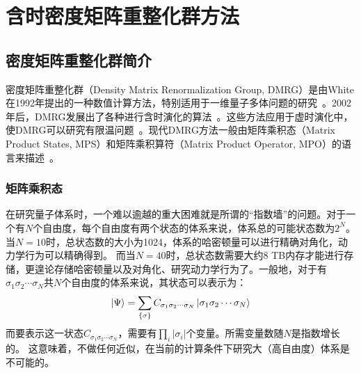 \documentclass{article}
\begin{document}
\section{含时密度矩阵重整化群方法}
\subsection{密度矩阵重整化群简介}
密度矩阵重整化群（Density Matrix Renormalization Group, DMRG）是由White在1992年提出的一种数值计算方法，特别适用于一维量子多体问题的研究~\cite{White92, White93}。2002年后，DMRG发展出了各种进行含时演化的算法~\cite{Caza02, Luo03, Vidal04, White04, Delay04, White05td, Haeg11, Haeg16, Garnet09}。这些方法应用于虚时演化中，使DMRG可以研究有限温问题~\cite{Vers04, Zwolak04, White05ft, Bart13}。现代DMRG方法一般由矩阵乘积态（Matrix Product States, MPS）和矩阵乘积算符（Matrix Product Operator, MPO）的语言来描述~\cite{Schol11}。

\subsubsection{矩阵乘积态}

在研究量子体系时，一个难以逾越的重大困难就是所谓的“指数墙”的问题。对于一个有$N$个自由度，每个自由度有两个状态的体系来说，体系总的可能状态数为$2^N$。
当$N=10$时，总状态数的大小为1024，体系的哈密顿量可以进行精确对角化，动力学行为可以精确得到。
而当$N=40$时，总状态数需要大约8 TB内存才能进行存储，更遑论存储哈密顿量以及对角化、研究动力学行为了。一般地，对于有$\sigma_1\sigma_2\cdots\sigma_N $共$N$个自由度的体系来说，其状态可以表示为：
\begin{equation}
        | \Psi \rangle  = \sum_{\{\sigma\}} C_{\sigma_1\sigma_2\cdots\sigma_N }  \ket{ \sigma_1\sigma_2\cdots\sigma_N } 
\end{equation}
而要表示这一状态$C_{\sigma_1\sigma_2\cdots\sigma_N }$，需要有$\prod_i |\sigma_i|$个变量。所需变量数随$N$是指数增长的。
这意味着，不做任何近似，在当前的计算条件下研究大（高自由度）体系是不可能的。
\end{document}
